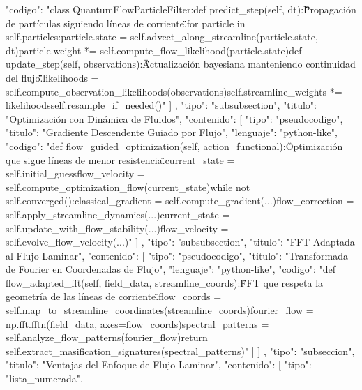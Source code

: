 \documentclass{article}
\begin{document}
{{{{{                  "codigo": "class QuantumFlowParticleFilter:\n    def predict_step(self, dt):\n        \"\"\"Propagación de partículas siguiendo líneas de corriente.\"\"\"\n        for particle in self.particles:\n            particle.state = self.advect_along_streamline(particle.state, dt)\n            particle.weight *= self.compute_flow_likelihood(particle.state)\n\n    def update_step(self, observations):\n        \"\"\"Actualización bayesiana manteniendo continuidad del flujo.\"\"\"\n        likelihoods = self.compute_observation_likelihoods(observations)\n        self.streamline_weights *= likelihoods\n        self.resample_if_needed()"
                }
              ]
            },
            {
              "tipo": "subsubsection",
              "titulo": "Optimización con Dinámica de Fluidos",
              "contenido": [
                {
                  "tipo": "pseudocodigo",
                  "titulo": "Gradiente Descendente Guiado por Flujo",
                  "lenguaje": "python-like",
                  "codigo": "def flow_guided_optimization(self, action_functional):\n    \"\"\"Optimización que sigue líneas de menor resistencia.\"\"\"\n    current_state = self.initial_guess\n    flow_velocity = self.compute_optimization_flow(current_state)\n    while not self.converged():\n        classical_gradient = self.compute_gradient(...)\n        flow_correction = self.apply_streamline_dynamics(...)\n        current_state = self.update_with_flow_stability(...)\n        flow_velocity = self.evolve_flow_velocity(...)"
                }
              ]
            },
            {
              "tipo": "subsubsection",
              "titulo": "FFT Adaptada al Flujo Laminar",
              "contenido": [
                {
                  "tipo": "pseudocodigo",
                  "titulo": "Transformada de Fourier en Coordenadas de Flujo",
                  "lenguaje": "python-like",
                  "codigo": "def flow_adapted_fft(self, field_data, streamline_coords):\n    \"\"\"FFT que respeta la geometría de las líneas de corriente.\"\"\"\n    flow_coords = self.map_to_streamline_coordinates(streamline_coords)\n    fourier_flow = np.fft.fftn(field_data, axes=flow_coords)\n    spectral_patterns = self.analyze_flow_patterns(fourier_flow)\n    return self.extract_masification_signatures(spectral_patterns)"
                }
              ]
            }
          ]
        },
        {
          "tipo": "subseccion",
          "titulo": "Ventajas del Enfoque de Flujo Laminar",
          "contenido": [
            {
              "tipo": "lista_numerada",
}}}}
\end{document}
